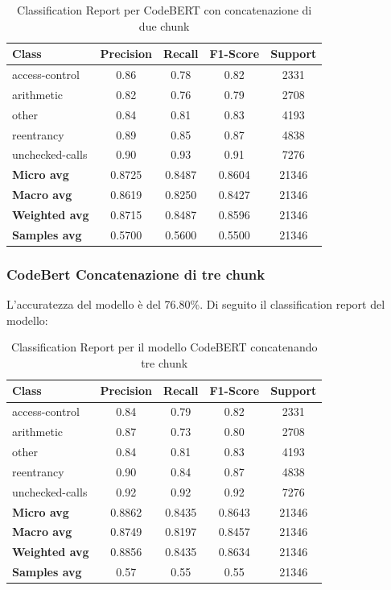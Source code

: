 \documentclass[../../Thesis.tex]{subfiles}
\begin{document}
\begin{table}[H]
    \centering
    \small
    \begin{tabular}{lcccc}
    \hline
    \textbf{Class} & \textbf{Precision} & \textbf{Recall} & \textbf{F1-Score} & \textbf{Support} \\
    \hline
    access-control & 0.86 & 0.78 & 0.82 & 2331 \\
    arithmetic & 0.82 & 0.76 & 0.79 & 2708 \\
    other & 0.84 & 0.81 & 0.83 & 4193 \\
    reentrancy & 0.89 & 0.85 & 0.87 & 4838 \\
    unchecked-calls & 0.90 & 0.93 & 0.91 & 7276 \\
    \hline
    \textbf{Micro avg} & 0.8725 & 0.8487 & 0.8604 & 21346 \\
    \textbf{Macro avg} & 0.8619 & 0.8250 & 0.8427 & 21346 \\
    \textbf{Weighted avg} & 0.8715 & 0.8487 & 0.8596 & 21346 \\
    \textbf{Samples avg} & 0.5700 & 0.5600 & 0.5500 & 21346 \\
    \hline
    \end{tabular}
    \caption{Classification Report per CodeBERT con concatenazione di due chunk}
    \end{table}
\subsubsection{CodeBert Concatenazione di tre chunk}
L'accuratezza del modello è del 76.80\%. Di seguito il classification report del modello:

\begin{table}[H]
    \centering
    \small
    \begin{tabular}{lcccc}
    \hline
    \textbf{Class} & \textbf{Precision} & \textbf{Recall} & \textbf{F1-Score} & \textbf{Support} \\
    \hline
    access-control & 0.84 & 0.79 & 0.82 & 2331 \\
    arithmetic & 0.87 & 0.73 & 0.80 & 2708 \\
    other & 0.84 & 0.81 & 0.83 & 4193 \\
    reentrancy & 0.90 & 0.84 & 0.87 & 4838 \\
    unchecked-calls & 0.92 & 0.92 & 0.92 & 7276 \\
    \hline
    \textbf{Micro avg} & 0.8862 & 0.8435 & 0.8643 & 21346 \\
    \textbf{Macro avg} & 0.8749 & 0.8197 & 0.8457 & 21346 \\
    \textbf{Weighted avg} & 0.8856 & 0.8435 & 0.8634 & 21346 \\
    \textbf{Samples avg} & 0.57 & 0.55 & 0.55 & 21346 \\
    \hline
    \end{tabular}
    \caption{Classification Report per il modello CodeBERT concatenando tre chunk}
\end{table}
\end{document}
